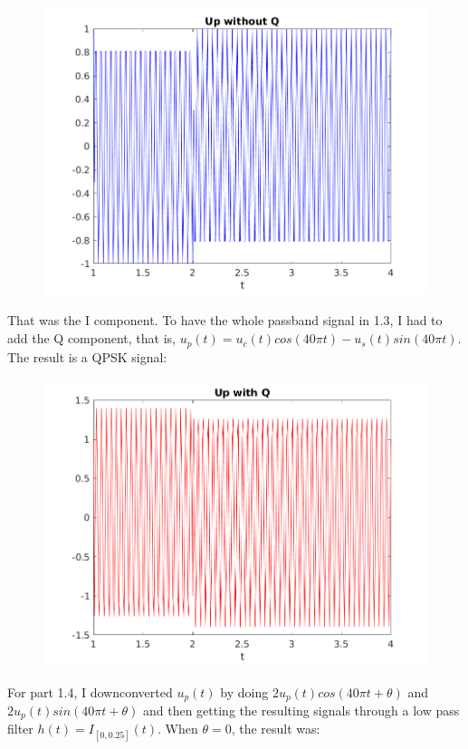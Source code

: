 \documentclass[a4paper,11pt]{article}
\begin{document}
\begin{figure}[!ht]
	\centering
	\includegraphics[scale = 0.6]{images/1_2.png}
\end{figure}

\newpage

That was the I component. To have the whole passband signal in 1.3, I had to add
the Q component, that is, $u_p(t) = u_c(t)cos(40\pi t) - u_s(t)sin(40\pi t)$. The
result is a QPSK signal:

\begin{figure}[!ht]
	\centering
	\includegraphics[scale = 0.8]{images/1_3.png}
\end{figure}

For part 1.4, I downconverted $u_p(t)$ by doing $2u_p(t)cos(40\pi t+\theta)$ and
$2u_p(t)sin(40\pi t+\theta)$ and then getting the resulting signals through a
low pass filter $h(t)=I_{[0,0.25]}(t)$. When $\theta = 0$, the result was:
\end{document}
